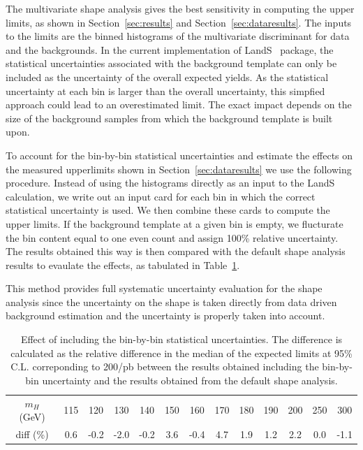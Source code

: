 The multivariate shape analysis gives the best sensitivity in computing the upper limits, 
as shown in Section~\ref{sec:results} and Section~\ref{sec:dataresults}. 
The inputs to the limits are the binned histograms of the multivariate discriminant for 
data and the backgrounds.  
In the current implementation of LandS~\cite{lands} package, 
the statistical uncertainties associated with the background template 
can only be included as the uncertainty of the overall expected yields.  
As the statistical uncertainty at each bin is larger than the overall uncertainty, 
this simpfied approach could lead to an overestimated limit. 
The exact impact depends on the size of the background samples from which 
the background template is built upon. 

To account for the bin-by-bin statistical uncertainties and estimate
the effects on the measured upperlimits shown in
Section~\ref{sec:dataresults} we use the following procedure. Instead
of using the histograms directly as an input to the LandS calculation,
we write out an input card for each bin in which the correct
statistical uncertainty is used. We then combine these cards to
compute the upper limits. If the background template at a given bin is
empty, we flucturate the bin content equal to one even count and
assign 100\% relative uncertainty.  The results obtained this way is
then compared with the default shape analysis results to evaulate the
effects, as tabulated in Table~\ref{tab:shapeuncertain}.

This method provides full systematic uncertainty evaluation for the
shape analysis since the uncertainty on the shape is taken directly
from data driven background estimation and the uncertainty is properly
taken into account.

\begin{table}
\begin{center}
\begin{tabular}{c c c c c c c c c c c c c}
\hline
 $m_H$ (GeV) & 115 & 120 & 130 & 140 & 150 & 160 & 170 & 180 & 190 & 200 & 250 & 300 \\
  diff (\%) & 0.6 & -0.2 & -2.0 & -0.2 & 3.6 & -0.4 & 4.7 & 1.9 & 1.2 & 2.2 & 0.0 & -1.1 \\
\hline
\end{tabular}
\end{center}
\caption{Effect of including the bin-by-bin statistical uncertainties. The difference is calculated as the 
relative difference in the median of the expected limits at 95\% C.L. correponding to 200/pb  
between the results obtained including the bin-by-bin uncertainty and the results obtained 
from the default shape analysis. }
\label{tab:shapeuncertain}
\end{table}

